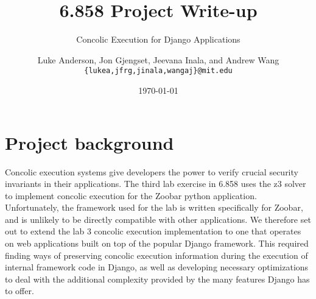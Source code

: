 \documentclass{scrartcl}
\author{Luke Anderson, Jon Gjengset, Jeevana Inala, and Andrew Wang \\
	\texttt{\{lukea,jfrg,jinala,wangaj\}@mit.edu}
}
\title{6.858 Project Write-up}
\subtitle{Concolic Execution for Django Applications}
\date{\today}
\begin{document}
\maketitle

\section{Project background}
Concolic execution systems give developers the power to verify crucial security
invariants in their applications. The third lab exercise in 6.858 uses the z3
solver to implement concolic execution for the Zoobar python application.
Unfortunately, the framework used for the lab is written specifically for
Zoobar, and is unlikely to be directly compatible with other applications. We
therefore set out to extend the lab 3 concolic execution implementation to one
that operates on web applications built on top of the popular Django framework.
This required finding ways of preserving concolic execution information during
the execution of internal framework code in Django, as well as developing
necessary optimizations to deal with the additional complexity provided by the
many features Django has to offer.
\end{document}
